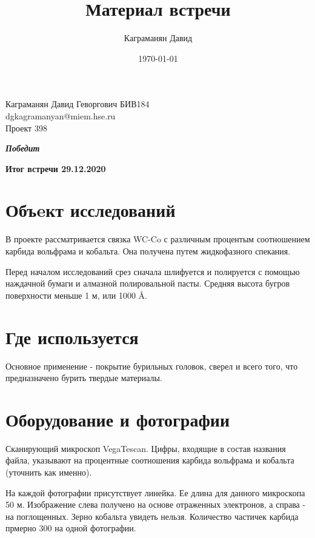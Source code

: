 \documentclass[a4paper, 14pt]{article}
\author{Каграманян Давид}
\title{Материал встречи}
\date{\today}
\begin{document}
	\thispagestyle{empty}
	\hfill\begin{minipage}{0.4\textwidth}
	    Каграманян Давид Геворгович БИВ184\\
	    dgkagramanyan@miem.hse.ru\\
	    Проект 398\\

	\end{minipage}%

	\begin{center}


		\textbf{\textit{Победит}}
		
		\vspace{1ex}
		
		\textbf{Итог встречи 29.12.2020}
	

	\end{center}

	\section{Объeкт исследований}
	
	В проекте рассматривается связка WC-Co с различным процентым соотношением карбида вольфрама и кобальта.
	Она получена путем жидкофазного спекания.
	 
	Перед началом исследований срез сначала шлифуется и полируется с помощью наждачной бумаги и алмазной
	полировальной пасты. Средняя высота бугров поверхности меньше 1 \textmu м, или 1000 \r A. 
	
	\section{Где используется}
	
	Основное применение - покрытие бурильных головок, сверел и всего того, что предназначено бурить твердые материалы.
	 
	\section{Оборудование и фотографии}
	 
	 Сканирующий микроскоп VegaTescan. Цифры, входящие в состав названия файла, указывают на процентные соотношения карбида вольфрама и кобальта (уточнить как именно).

	На каждой фотографии присутствует линейка. Ее длина для данного микроскопа  50 \textmu м.
	Изображение слева получено на основе отраженных электронов, а справа - на поглощенных. 
	Зерно кобальта увидеть нельзя. Количество частичек карбида прмерно 300 на одной фотографии. 
	
\end{document}
